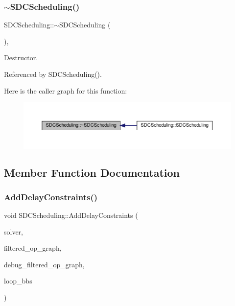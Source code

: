 \subsubsection{\texorpdfstring{$\sim$\+S\+D\+C\+Scheduling()}{~SDCScheduling()}}
{\footnotesize\ttfamily S\+D\+C\+Scheduling\+::$\sim$\+S\+D\+C\+Scheduling (\begin{DoxyParamCaption}{ }\end{DoxyParamCaption})\hspace{0.3cm}{\ttfamily [override]}, {\ttfamily [default]}}



Destructor. 



Referenced by S\+D\+C\+Scheduling().

Here is the caller graph for this function\+:
\nopagebreak
\begin{figure}[H]
\begin{center}
\leavevmode
\includegraphics[width=350pt]{d4/dc5/classSDCScheduling_ac3ba79175a36258e60ebf591fb0054e4_icgraph}
\end{center}
\end{figure}


\subsection{Member Function Documentation}
\mbox{\label{classSDCScheduling_afbe0541a2c1778638bbe1c1251771b8d}} 
\subsubsection{\texorpdfstring{Add\+Delay\+Constraints()}{AddDelayConstraints()}}
{\footnotesize\ttfamily void S\+D\+C\+Scheduling\+::\+Add\+Delay\+Constraints (\begin{DoxyParamCaption}\item[{const meilp\+\_\+solver\+Ref}]{solver,  }\item[{const \hyperlink{op__graph_8hpp_a9a0b240622c47584bee6951a6f5de746}{Op\+Graph\+Const\+Ref}}]{filtered\+\_\+op\+\_\+graph,  }\item[{const \hyperlink{op__graph_8hpp_a9a0b240622c47584bee6951a6f5de746}{Op\+Graph\+Const\+Ref}}]{debug\+\_\+filtered\+\_\+op\+\_\+graph,  }\item[{const std\+::set$<$ \hyperlink{graph_8hpp_abefdcf0544e601805af44eca032cca14}{vertex}, \hyperlink{classbb__vertex__order__by__map}{bb\+\_\+vertex\+\_\+order\+\_\+by\+\_\+map} $>$ \&}]{loop\+\_\+bbs }\end{DoxyParamCaption})\hspace{0.3cm}{\ttfamily [protected]}}



